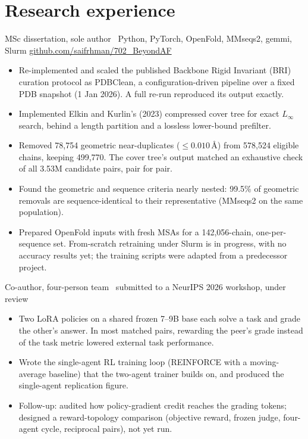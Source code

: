 \documentclass[10pt]{article}
\begin{document}
\section{Research experience}
  {MSc dissertation, sole author \textbullet\ Python, PyTorch, OpenFold, MMseqs2, gemmi, Slurm}
  {\href{https://github.com/saifrhman/702_BeyondAF}{github.com/saifrhman/702\_BeyondAF}}
\begin{itemize}
  \item Re-implemented and scaled the published Backbone Rigid Invariant (BRI) curation protocol as PDBClean, a
    configuration-driven pipeline over a fixed PDB snapshot (1 Jan 2026). A full re-run reproduced its output exactly.
  \item Implemented Elkin and Kurlin's (2023) compressed cover tree for exact $L_\infty$ search, behind a length
    partition and a lossless lower-bound prefilter.
  \item Removed 78,754 geometric near-duplicates ($\le 0.010$\,\AA) from 578,524 eligible chains, keeping 499,770.
    The cover tree's output matched an exhaustive check of all 3.53M candidate pairs, pair for pair.
  \item Found the geometric and sequence criteria nearly nested: 99.5\% of geometric removals are sequence-identical
    to their representative (MMseqs2 on the same population).
  \item Prepared OpenFold inputs with fresh MSAs for a 142,056-chain, one-per-sequence set. From-scratch retraining
    under Slurm is in progress, with no accuracy results yet; the training scripts were adapted from a predecessor project.
\end{itemize}
\gap
{}
  {Co-author, four-person team \textbullet\ submitted to a NeurIPS 2026 workshop, under review}{}
\begin{itemize}
  \item Two LoRA policies on a shared frozen 7--9B base each solve a task and grade the other's answer. In most
    matched pairs, rewarding the peer's grade instead of the task metric lowered external task performance.
  \item Wrote the single-agent RL training loop (REINFORCE with a moving-average baseline) that the two-agent trainer
    builds on, and produced the single-agent replication figure.
  \item Follow-up: audited how policy-gradient credit reaches the grading tokens; designed a reward-topology
    comparison (objective reward, frozen judge, four-agent cycle, reciprocal pairs), not yet run.
\end{itemize}
\end{document}

